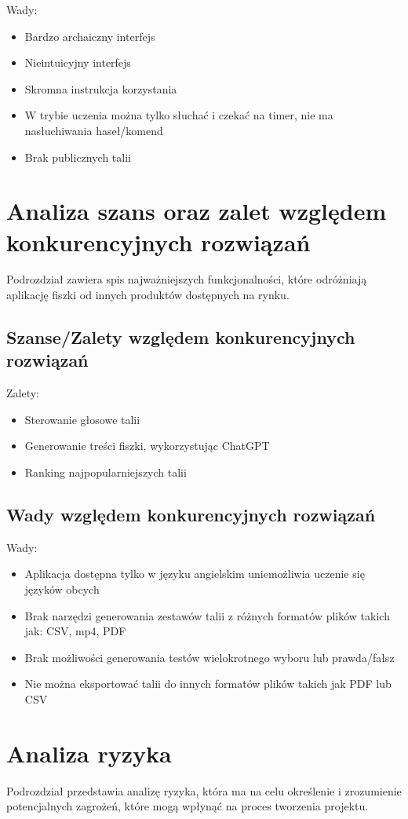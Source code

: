 Wady:
\begin{itemize}
    \item Bardzo archaiczny interfejs
    \item Nieintuicyjny interfejs
    \item Skromna instrukcja korzystania
    \item W trybie uczenia można tylko słuchać i czekać na timer, nie ma nasłuchiwania haseł/komend
    \item Brak publicznych talii
\end{itemize}

\section{Analiza szans oraz zalet względem konkurencyjnych rozwiązań}

Podrozdział zawiera spis najważniejszych funkcjonalności, które odróżniają aplikację fiszki od innych produktów dostępnych na rynku.

\subsection{Szanse/Zalety względem konkurencyjnych rozwiązań}

Zalety:
\begin{itemize}
    \item Sterowanie głosowe talii
    \item Generowanie treści fiszki, wykorzystując ChatGPT
    \item Ranking najpopularniejszych talii
\end{itemize}

\subsection{Wady względem konkurencyjnych rozwiązań}

Wady:
\begin{itemize}
    \item Aplikacja dostępna tylko w języku angielskim uniemożliwia uczenie się języków obcych
    \item Brak narzędzi generowania zestawów talii z różnych formatów plików takich jak: CSV, mp4, PDF
    \item Brak możliwości generowania testów wielokrotnego wyboru lub prawda/fałsz
    \item Nie można eksportować talii do innych formatów plików takich jak PDF lub CSV
\end{itemize}

\section{Analiza ryzyka}

Podrozdział przedstawia analizę ryzyka, która ma na celu określenie i zrozumienie potencjalnych zagrożeń, które mogą wpłynąć na proces tworzenia projektu.




